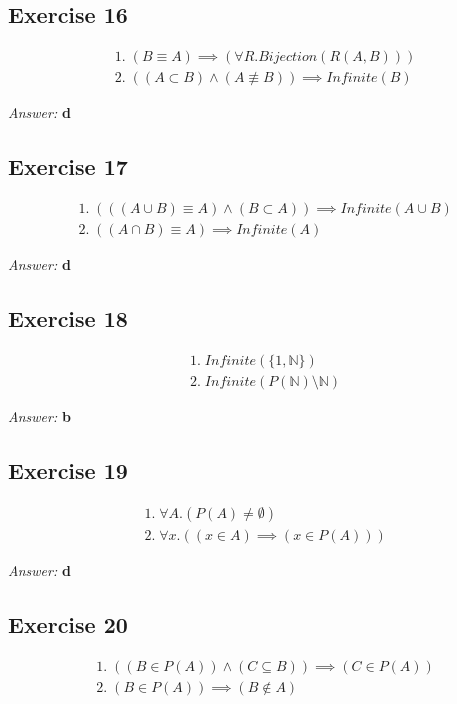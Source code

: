 \documentclass[11pt]{article}
\begin{document}
\subsection{Exercise 16}
\label{sec-2-16}
\begin{equation}
\begin{split}
& 1.\; (B \equiv A) \implies (\forall R. Bijection(R(A, B))) \\
& 2.\; ((A \subset B) \land (A \not \equiv B)) \implies Infinite(B)
\end{split}
\end{equation}

\emph{Answer:} \textbf{d}
\subsection{Exercise 17}
\label{sec-2-17}
\begin{equation}
\begin{split}
& 1.\; (((A \cup B) \equiv A) \land (B \subset A)) \implies Infinite(A \cup B) \\
& 2.\; ((A \cap B) \equiv A) \implies Infinite(A)
\end{split}
\end{equation}

\emph{Answer:} \textbf{d}
\subsection{Exercise 18}
\label{sec-2-18}
\begin{equation}
\begin{split}
& 1.\; Infinite(\{1, \mathbb{N}\}) \\
& 2.\; Infinite(P(\mathbb{N}) \setminus \mathbb{N})
\end{split}
\end{equation}

\emph{Answer:} \textbf{b}
\subsection{Exercise 19}
\label{sec-2-19}
\begin{equation}
\begin{split}
& 1.\; \forall A. (P(A) \neq \emptyset) \\
& 2.\; \forall x. ((x \in A) \implies (x \in P(A)))
\end{split}
\end{equation}

\emph{Answer:} \textbf{d}
\subsection{Exercise 20}
\label{sec-2-20}
\begin{equation}
\begin{split}
& 1.\; ((B \in P(A)) \land (C \subseteq B)) \implies (C \in P(A)) \\
& 2.\; (B \in P(A)) \implies (B \not \in A)
\end{split}
\end{equation}
\end{document}
